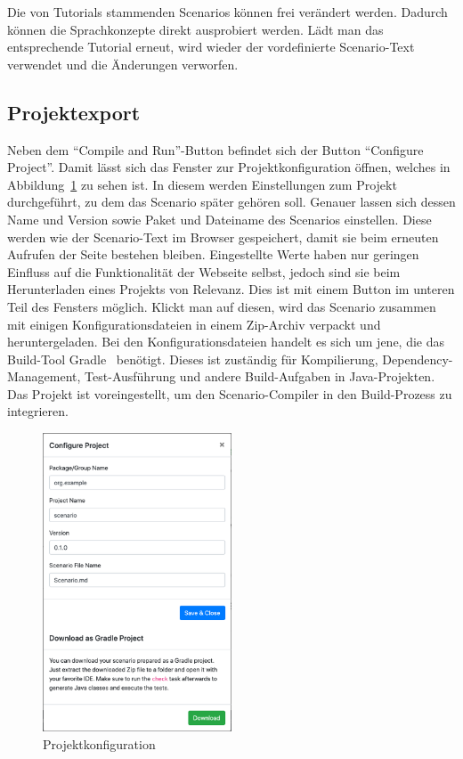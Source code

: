 Die von Tutorials stammenden Scenarios können frei verändert werden.
Dadurch können die Sprachkonzepte direkt ausprobiert werden.
Lädt man das entsprechende Tutorial erneut, wird wieder der vordefinierte Scenario-Text verwendet und die Änderungen verworfen.

\subsection{Projektexport}\label{subsec:project-export}

Neben dem ``Compile and Run''-Button befindet sich der Button ``Configure Project''.
Damit lässt sich das Fenster zur Projektkonfiguration öffnen, welches in Abbildung~\ref{fig:project-config} zu sehen ist.
In diesem werden Einstellungen zum Projekt durchgeführt, zu dem das Scenario später gehören soll.
Genauer lassen sich dessen Name und Version sowie Paket und Dateiname des Scenarios einstellen.
Diese werden wie der Scenario-Text im Browser gespeichert, damit sie beim erneuten Aufrufen der Seite bestehen bleiben.
Eingestellte Werte haben nur geringen Einfluss auf die Funktionalität der Webseite selbst, jedoch sind sie beim Herunterladen eines Projekts von Relevanz.
Dies ist mit einem Button im unteren Teil des Fensters möglich.
Klickt man auf diesen, wird das Scenario zusammen mit einigen Konfigurationsdateien in einem Zip-Archiv verpackt und heruntergeladen.
Bei den Konfigurationsdateien handelt es sich um jene, die das Build-Tool Gradle~\cite{gradle} benötigt.
Dieses ist zuständig für Kompilierung, Dependency-Management, Test-Ausführung und andere Build-Aufgaben in Java-Projekten.
Das Projekt ist voreingestellt, um den Scenario-Compiler in den Build-Prozess zu integrieren.

\begin{figure}
    \centering
    \includegraphics[width=0.5\textwidth]{chapter/fulib.org/img/project-config.png}
    \caption{Projektkonfiguration}
    \label{fig:project-config}
\end{figure}

